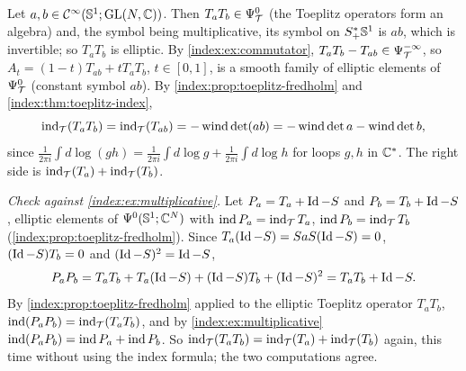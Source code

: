 \subsection*{}
Let $a,b\in\mathcal{C}^\infty(\mathbb{S}^1;\operatorname{GL}(N,\mathbb{C}))$. Then $T_aT_b\in\Psi^{0}_{\mathcal T}$ (the Toeplitz operators form
an algebra) and, the symbol being multiplicative, its symbol on $S^*_+\mathbb{S}^1$ is $ab$,
which is invertible; so $T_aT_b$ is elliptic. By \cref{index:ex:commutator},
$T_aT_b-T_{ab}\in\Psi^{-\infty}_{\mathcal T}$, so $A_t=(1-t)T_{ab}+tT_aT_b$, $t\in[0,1]$, is a smooth
family of elliptic elements of $\Psi^{0}_{\mathcal T}$ (constant symbol $ab$). By
\cref{index:prop:toeplitz-fredholm} and \cref{index:thm:toeplitz-index},
\begin{equation*}
  \operatorname{ind}_{\mathcal T}(T_aT_b)=\operatorname{ind}_{\mathcal T}(T_{ab})=-\operatorname{wind}\det(ab)
  =-\operatorname{wind}\det a-\operatorname{wind}\det b,
\end{equation*}
since $\frac1{2\pi i}\int d\log(gh)=\frac1{2\pi i}\int d\log g+\frac1{2\pi i}\int d\log h$
for loops $g,h$ in $\mathbb{C}^*$. The right side is $\operatorname{ind}_{\mathcal T}(T_a)+\operatorname{ind}_{\mathcal T}(T_b)$.

\emph{Check against \cref{index:ex:multiplicative}.} Let $P_a=T_a+\operatorname{Id}-S$ and
$P_b=T_b+\operatorname{Id}-S$, elliptic elements of $\Psi^{0}(\mathbb{S}^1;\mathbb{C}^N)$ with
$\operatorname{ind} P_a=\operatorname{ind}_{\mathcal T}T_a$, $\operatorname{ind} P_b=\operatorname{ind}_{\mathcal T}T_b$
(\cref{index:prop:toeplitz-fredholm}). Since $T_a(\operatorname{Id}-S)=SaS(\operatorname{Id}-S)=0$,
$(\operatorname{Id}-S)T_b=0$ and $(\operatorname{Id}-S)^2=\operatorname{Id}-S$,
\begin{equation*}
  P_aP_b=T_aT_b+T_a(\operatorname{Id}-S)+(\operatorname{Id}-S)T_b+(\operatorname{Id}-S)^2=T_aT_b+\operatorname{Id}-S .
\end{equation*}
By \cref{index:prop:toeplitz-fredholm} applied to the elliptic Toeplitz operator
$T_aT_b$, $\operatorname{ind}(P_aP_b)=\operatorname{ind}_{\mathcal T}(T_aT_b)$, and by \cref{index:ex:multiplicative}
$\operatorname{ind}(P_aP_b)=\operatorname{ind} P_a+\operatorname{ind} P_b$. So
$\operatorname{ind}_{\mathcal T}(T_aT_b)=\operatorname{ind}_{\mathcal T}(T_a)+\operatorname{ind}_{\mathcal T}(T_b)$ again, this time
without using the index formula; the two computations agree.
